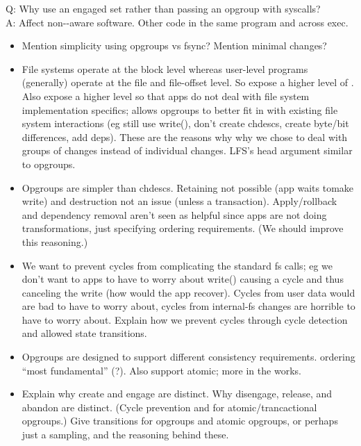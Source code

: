 Q: Why use an engaged set rather than passing an opgroup with syscalls?\\
A: Affect non-\opgroup{}-aware software. Other code in the same program
and across exec.

\begin{itemize}
\item Mention simplicity using opgroups vs fsync? Mention minimal changes?
\item File systems operate at the block level whereas user-level
  programs (generally) operate at the file and file-offset level.
  So expose a higher level of \chdescs. Also expose a
  higher level so that apps do not deal with file system
  implementation specifics; allows opgroups to better fit in with
  existing file system interactions (eg still use write(), don't
  create chdescs, create byte/bit differences, add deps). These are
  the reasons why why we chose to deal with groups of changes
  instead of individual changes. LFS's head argument similar to
  opgroups.
\item Opgroups are simpler than chdescs. Retaining not possible (app
  waits tomake write) and destruction not an issue (unless a
  transaction). Apply/rollback and dependency removal aren't seen as
  helpful since apps are not doing transformations, just specifying
  ordering requirements. (We should improve this reasoning.)
\item We want to prevent cycles from complicating the standard fs
  calls; eg we don't want to apps to have to worry about write()
  causing a cycle and thus canceling the write (how would the app
  recover). Cycles from user data would are bad to have to worry
  about, cycles from internal-fs changes are horrible to have to
  worry about. Explain how we prevent cycles through cycle detection
  and allowed state transitions.

\item Opgroups are designed to support different consistency
  requirements. ordering ``most fundamental'' (?). Also support
  atomic; more in the works.
\item Explain why create and engage are distinct. Why disengage,
  release, and abandon are distinct. (Cycle prevention and for
  atomic/trancactional opgroups.) Give transitions for opgroups and
  atomic opgroups, or perhaps just a sampling, and the reasoning
  behind these.
\end{itemize}

